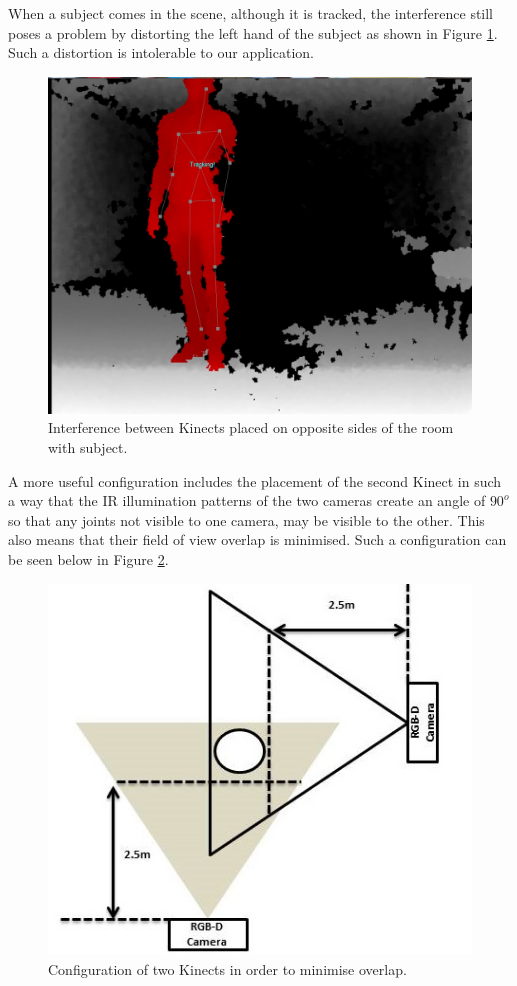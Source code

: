 \documentclass[a4paper]{article}
\begin{document}
When a subject comes in the scene, although it is tracked, the interference still poses a problem by distorting the left hand of the subject as shown in Figure \ref{IR_interference_w_subject}. Such a distortion is intolerable to our application. 

\begin{figure}[H]
\centering
\includegraphics[scale=0.2]{IR_Interference3.jpg}
\caption{Interference between Kinects placed on opposite sides of the room with subject.}
\label{IR_interference_w_subject}
\end{figure}

A more useful configuration includes the placement of the second Kinect in such a way that the IR illumination patterns of the two cameras create an angle of $90^o$ so that any joints not visible to one camera, may be visible to the other. This also means that their field of view overlap is minimised. Such a configuration can be seen below in Figure \ref{2_cameras_config2}.

\begin{figure}[H]
\centering
\includegraphics[scale=0.4]{figure_2cameras.jpg}
\caption{Configuration of two Kinects in order to minimise overlap.}
\label{2_cameras_config2}
\end{figure}
\end{document}
